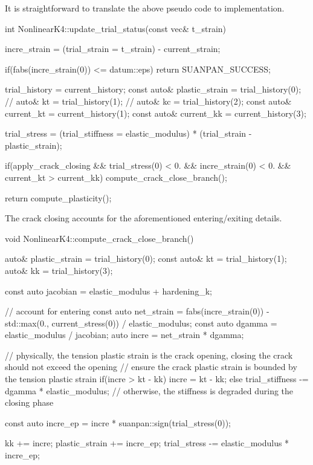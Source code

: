 It is straightforward to translate the above pseudo code to implementation.
\begin{cppcode}
int NonlinearK4::update_trial_status(const vec& t_strain) {
    incre_strain = (trial_strain = t_strain) - current_strain;

    if(fabs(incre_strain(0)) <= datum::eps) return SUANPAN_SUCCESS;

    trial_history = current_history;
    const auto& plastic_strain = trial_history(0);
    // auto& kt = trial_history(1);
    // auto& kc = trial_history(2);
    const auto& current_kt = current_history(1);
    const auto& current_kk = current_history(3);

    trial_stress = (trial_stiffness = elastic_modulus) * (trial_strain - plastic_strain);

    if(apply_crack_closing && trial_stress(0) < 0. && incre_strain(0) < 0. && current_kt > current_kk) compute_crack_close_branch();

    return compute_plasticity();
}
\end{cppcode}

The crack closing accounts for the aforementioned entering/exiting details.
\begin{cppcode}
void NonlinearK4::compute_crack_close_branch() {
    auto& plastic_strain = trial_history(0);
    const auto& kt = trial_history(1);
    auto& kk = trial_history(3);

    const auto jacobian = elastic_modulus + hardening_k;

    // account for entering
    const auto net_strain = fabs(incre_strain(0)) - std::max(0., current_stress(0)) / elastic_modulus;
    const auto dgamma = elastic_modulus / jacobian;
    auto incre = net_strain * dgamma;

    // physically, the tension plastic strain is the crack opening, closing the crack should not exceed the opening
    // ensure the crack plastic strain is bounded by the tension plastic strain
    if(incre > kt - kk) incre = kt - kk;
    else trial_stiffness -= dgamma * elastic_modulus; // otherwise, the stiffness is degraded during the closing phase

    const auto incre_ep = incre * suanpan::sign(trial_stress(0));

    kk += incre;
    plastic_strain += incre_ep;
    trial_stress -= elastic_modulus * incre_ep;
}
\end{cppcode}

